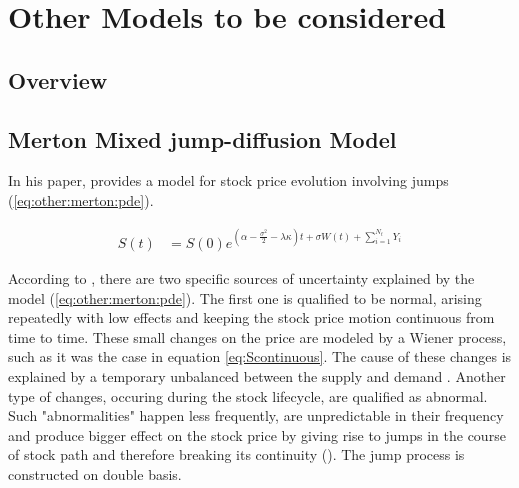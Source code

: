\documentclass[a4paper, 12pt]{report}
\newcommand{\Bm}{W\left(t\right)}
\newcommand{\St}{S\left(t\right)}
\begin{document}
%
%
\chapter{Other Models to be considered}
\label{cha:OtherModel}


\section{Overview}
\label{sub:OverviewJump}

\section{Merton Mixed jump-diffusion Model}
\label{sec:other:merton}

In his paper, \citet{merton76} provides a model for stock price evolution involving jumps (\cref{eq:other:merton:pde}). 


\begin{align}
  \St &= S\left(0\right) e^{\left(\alpha - \frac{\sigma^2}{2} - \lambda \kappa\right) t + \sigma \Bm + \sum_{i=1}^{N_t} Y_i}
  \label{eq:other:merton:pde}
\end{align}
  
According to \citet{merton76}, there are two specific sources of uncertainty explained by the model (\cref{eq:other:merton:pde}). 
The first one is qualified to be normal, arising repeatedly with low effects and keeping the stock price motion continuous from time to time. These small changes on the price are modeled by a Wiener process, such as it was the case in equation \ref{eq:Scontinuous}. The cause of these changes is explained by a temporary unbalanced between the supply and demand \citet{merton76}.
Another type of changes, occuring during the stock lifecycle, are qualified as abnormal. Such "abnormalities" happen less frequently, are unpredictable in their frequency and produce bigger effect on the stock price by giving rise to jumps in the course of stock path and therefore breaking its continuity (\citet{merton76}). The jump process is constructed on double basis. 
\end{document}
